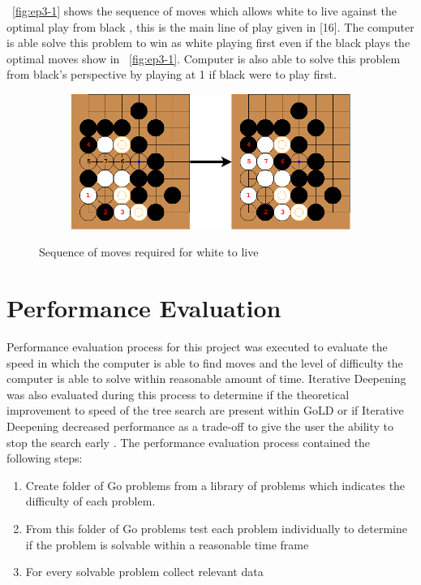\documentclass{l4proj}
\begin{document}
~\autoref{fig:ep3-1} shows the sequence of moves which allows white to live against the optimal play from black , this is the main line of play given in [16]. The computer is able solve this problem to win as white playing first even if the black plays the optimal moves show in ~\autoref{fig:ep3-1}. Computer is also able to solve this problem from black's perspective by playing at 1 if black were to play first.






\begin{figure}[!h]
\centering
\begin{subfigure}[b]{\textwidth}
\centering
\includegraphics[width=\textwidth]{ep3/ep3-1.png}
\end{subfigure}
\caption{Sequence of moves required for white to live}
\label{fig:ep3-1}
\end{figure}

\section{Performance Evaluation}

Performance evaluation process for this project was executed to evaluate the speed in which the computer is able to find moves and the level of difficulty the computer is able to solve within reasonable amount of time. Iterative Deepening was also evaluated during this process to determine if the theoretical improvement to speed of the tree search are present within GoLD or if Iterative Deepening decreased performance as a trade-off to give the user the ability to stop the search early .
The performance evaluation process contained the following steps:
\begin{enumerate}
\item Create folder of Go problems from a library of problems which indicates the difficulty of each problem.
\item From this folder of Go problems test each problem individually to determine if the problem is solvable within a reasonable time frame
\item For every solvable problem collect relevant data
\end{enumerate}
\end{document}
